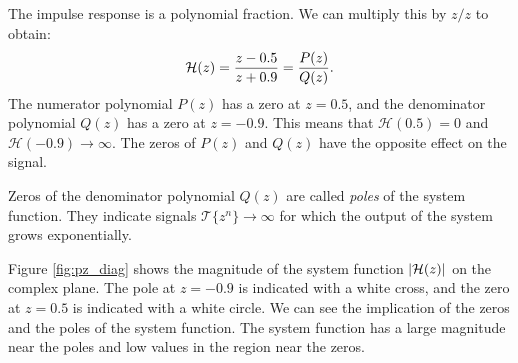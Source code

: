 The impulse response is a polynomial fraction. We can multiply this by
$z/z$ to obtain:
\begin{equation}
    \mathcal{H}(z) = \frac{z-0.5}{z+0.9} = \frac{P(z)}{Q(z)}.
    \label{eq:example_iir_system_hpf}
\end{equation}
The numerator polynomial $P(z)$ has a zero at $z=0.5$, and the
denominator polynomial $Q(z)$ has a zero at $z=-0.9$. This means that
$\mathcal{H}(0.5)=0$ and $\mathcal{H}(-0.9)\rightarrow \infty$. The
zeros of $P(z)$ and $Q(z)$ have the opposite effect on the signal.

Zeros of the denominator polynomial $Q(z)$ are called \emph{poles} of
the system function. They indicate signals
$\mathcal{T}\{z^{n}\} \rightarrow \infty$ for which the output of the
system grows exponentially.


Figure \ref{fig:pz_diag} shows the magnitude of the system function
$|\mathcal{H}(z)|$ on the complex plane. The pole at $z=-0.9$ is indicated with
a white cross, and the zero at $z=0.5$ is indicated with a white
circle. We can see the implication of the zeros and the poles of the
system function. The system function has a large magnitude near the
poles and low values in the region near the zeros.

